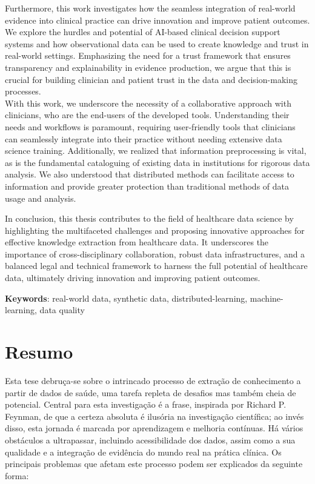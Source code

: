 Furthermore, this work investigates how the seamless integration of real-world evidence into clinical practice can drive innovation and improve patient outcomes. We explore the hurdles and potential of AI-based clinical decision support systems and how observational data can be used to create knowledge and trust in real-world settings. Emphasizing the need for a trust framework that ensures transparency and explainability in evidence production, we argue that this is crucial for building clinician and patient trust in the data and decision-making processes. \\

With this work, we underscore the necessity of a collaborative approach with clinicians, who are the end-users of the developed tools. Understanding their needs and workflows is paramount, requiring user-friendly tools that clinicians can seamlessly integrate into their practice without needing extensive data science training. Additionally, we realized that information preprocessing is vital, as is the fundamental cataloguing of existing data in institutions for rigorous data analysis. We also understood that distributed methods can facilitate access to information and provide greater protection than traditional methods of data usage and analysis.

In conclusion, this thesis contributes to the field of healthcare data science by highlighting the multifaceted challenges and proposing innovative approaches for effective knowledge extraction from healthcare data. It underscores the importance of cross-disciplinary collaboration, robust data infrastructures, and a balanced legal and technical framework to harness the full potential of healthcare data, ultimately driving innovation and improving patient outcomes.



\vspace*{10mm}\noindent
\textbf{Keywords}: real-world data, synthetic data, distributed-learning, machine-learning, data quality




\chapter*{Resumo}
Esta tese debruça-se sobre o intrincado processo de extração de conhecimento a partir de dados de saúde, uma tarefa repleta de desafios mas também cheia de potencial. Central para esta investigação é a frase, inspirada por Richard P. Feynman, de que a certeza absoluta é ilusória na investigação científica; ao invés disso, esta jornada é marcada por aprendizagem e melhoria contínuas. Há vários obstáculos a ultrapassar, incluindo acessibilidade dos dados, assim como a sua qualidade  e a integração de evidência do mundo real na prática clínica. Os principais problemas que afetam este processo podem ser explicados da seguinte forma:

